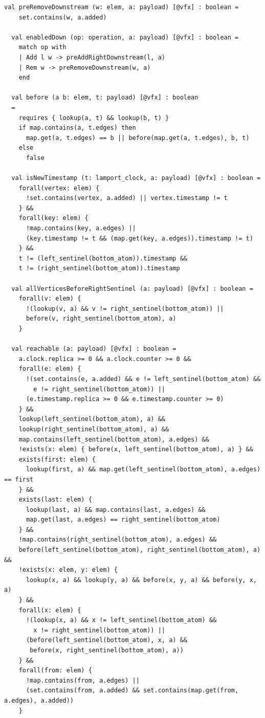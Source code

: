 \begin{lstlisting}[caption={\texttt{RGA}}, label={lst:app_rga}]
  val preRemoveDownstream (w: elem, a: payload) [@vfx] : boolean =
    set.contains(w, a.added)

  val enabledDown (op: operation, a: payload) [@vfx] : boolean =
    match op with
    | Add l w -> preAddRightDownstream(l, a)
    | Rem w -> preRemoveDownstream(w, a)
    end

  val before (a b: elem, t: payload) [@vfx] : boolean
  =
    requires { lookup(a, t) && lookup(b, t) }
    if map.contains(a, t.edges) then
      map.get(a, t.edges) == b || before(map.get(a, t.edges), b, t)
    else
      false

  val isNewTimestamp (t: lamport_clock, a: payload) [@vfx] : boolean =
    forall(vertex: elem) {
      !set.contains(vertex, a.added) || vertex.timestamp != t
    } &&
    forall(key: elem) {
      !map.contains(key, a.edges) ||
      (key.timestamp != t && (map.get(key, a.edges)).timestamp != t)
    } &&
    t != (left_sentinel(bottom_atom)).timestamp &&
    t != (right_sentinel(bottom_atom)).timestamp

  val allVerticesBeforeRightSentinel (a: payload) [@vfx] : boolean =
    forall(v: elem) {
      !(lookup(v, a) && v != right_sentinel(bottom_atom)) ||
      before(v, right_sentinel(bottom_atom), a)
    }

  val reachable (a: payload) [@vfx] : boolean =
    a.clock.replica >= 0 && a.clock.counter >= 0 &&
    forall(e: elem) {
      !(set.contains(e, a.added) && e != left_sentinel(bottom_atom) &&
        e != right_sentinel(bottom_atom)) ||
      (e.timestamp.replica >= 0 && e.timestamp.counter >= 0)
    } &&
    lookup(left_sentinel(bottom_atom), a) &&
    lookup(right_sentinel(bottom_atom), a) &&
    map.contains(left_sentinel(bottom_atom), a.edges) &&
    !exists(x: elem) { before(x, left_sentinel(bottom_atom), a) } &&
    exists(first: elem) {
      lookup(first, a) && map.get(left_sentinel(bottom_atom), a.edges) == first
    } &&
    exists(last: elem) {
      lookup(last, a) && map.contains(last, a.edges) &&
      map.get(last, a.edges) == right_sentinel(bottom_atom)
    } &&
    !map.contains(right_sentinel(bottom_atom), a.edges) &&
    before(left_sentinel(bottom_atom), right_sentinel(bottom_atom), a) &&
    !exists(x: elem, y: elem) {
      lookup(x, a) && lookup(y, a) && before(x, y, a) && before(y, x, a)
    } &&
    forall(x: elem) {
      !(lookup(x, a) && x != left_sentinel(bottom_atom) &&
        x != right_sentinel(bottom_atom)) ||
      (before(left_sentinel(bottom_atom), x, a) &&
       before(x, right_sentinel(bottom_atom), a))
    } &&
    forall(from: elem) {
      !map.contains(from, a.edges) ||
      (set.contains(from, a.added) && set.contains(map.get(from, a.edges), a.added))
    }


\end{lstlisting}
